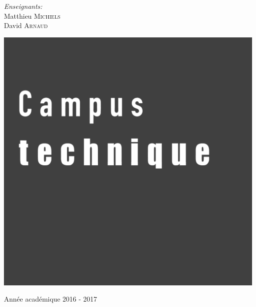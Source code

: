 \begin{center}
  \vspace{1.5cm}

  \begin{minipage}[t]{0.4 \textwidth}
    \begin{center} 
      \large \emph{Enseignants:} \\ 
      Matthieu \textsc{Michiels} \\
      David \textsc{Arnaud}
    \end{center} 
  \end{minipage}

  \vspace{1cm}

  \includegraphics[scale=0.08]{textures/logo/technical_bw.pdf}

  \vspace{0.5cm}

  Année académique 2016 - 2017
\end{center}

\thispagestyle{empty}
